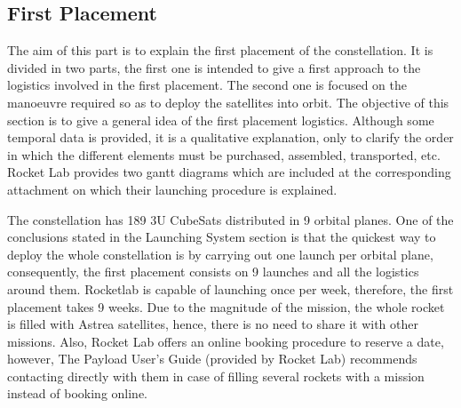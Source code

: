 \subsection{First Placement}
The aim of this part is to explain the first placement of the constellation. It is divided in two parts, the first one is intended to give a first approach to the logistics involved in the first placement. The second one is focused on the manoeuvre required so as to deploy the satellites into orbit. 
The objective of this section is to give a general idea of the first placement logistics. Although some temporal data is provided, it is a qualitative explanation, only to clarify the order in which the different elements must be purchased, assembled, transported, etc. %
Rocket Lab provides two gantt diagrams which are included at the corresponding attachment on which their launching procedure is explained.
%

The constellation has 189 3U CubeSats distributed in 9 orbital planes. One of the conclusions stated in the Launching System section  is that the quickest way to deploy the whole constellation is by carrying out one launch per orbital plane, consequently, the first placement consists on 9 launches and all the logistics around them. Rocketlab is capable of launching once per week, therefore, the first placement takes 9 weeks. Due to the magnitude of the mission, the whole rocket is filled with Astrea satellites, hence, there is no need to share it with other missions. Also, Rocket Lab offers an online booking procedure to reserve a date, however, The Payload User's Guide (provided by Rocket Lab) recommends contacting directly with them in case of filling several rockets with a mission instead of booking online.  

